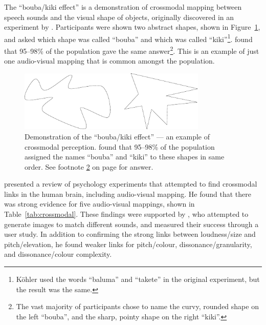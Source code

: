 The ``bouba/kiki effect'' is a demonstration of crossmodal mapping between speech sounds and the visual shape of
objects, originally discovered in an experiment by \citet{Koehler1929}.  Participants were shown two abstract shapes,
shown in Figure~\ref{fig:boubakiki}, and asked which shape was called ``bouba'' and which was called
``kiki''\footnote{K\"ohler used the words ``baluma'' and ``takete'' in the original experiment, but the result was the
same.}.  \citet{Ramachandran2001} found that 95--98\% of the population gave the same
answer\footnote{\label{bouba-kiki-answer}The vast majority of participants chose to name the curvy, rounded shape on
the left ``bouba'', and the sharp, pointy shape on the right ``kiki''.}. This is an example of just one audio-visual
mapping that is common amongst the population.

\begin{figure}[h]
\centering
  \centering
  \includegraphics[width=0.8\textwidth]{figs/bouba-kiki}
  \caption[Demonstration of the ``bouba/kiki effect'' --- an example of crossmodal perception.] {Demonstration of the
  ``bouba/kiki effect'' --- an example of crossmodal perception.  \citet{Ramachandran2001} found that 95--98\% of the
population assigned the names ``bouba'' and ``kiki'' to these shapes in same order. See footnote
\ref{bouba-kiki-answer} on page \pageref{bouba-kiki-answer} for answer.}
  \label{fig:boubakiki}
\end{figure}




\citet{Spence2011} presented a review of psychology experiments that attempted to find crossmodal links in the human
brain, including audio-visual mapping.  He found that there was strong evidence for five audio-visual mappings, shown in
Table~\ref{tab:crossmodal}.
These findings were supported by \citet{Tsiros2014}, who attempted to generate images to match different sounds, and
measured their success through a user study. In addition to confirming the strong links between loudness/size and
pitch/elevation, he found weaker links for pitch/colour, dissonance/granularity, and dissonance/colour complexity.

